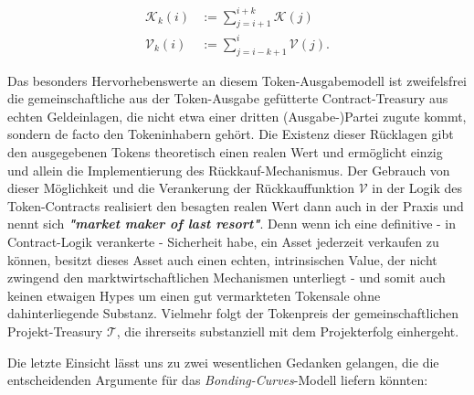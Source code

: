 \begin{align*}
\mathcal{K}_{k} \left( i \right) &:= \sum_{j = i + 1}^{i + k} \mathcal{K} \left( j \right) \\
\mathcal{V}_{k} \left( i \right) &:= \sum_{j = i - k + 1}^{i} \mathcal{V} \left( j \right).
\end{align*}

\vspace{0.3cm}

Das besonders Hervorhebenswerte an diesem Token-Ausgabemodell ist zweifelsfrei die gemeinschaftliche aus der Token-Ausgabe gefütterte Contract-Treasury aus echten Geldeinlagen, die nicht etwa einer dritten (Ausgabe-)Partei zugute kommt, sondern de facto den Tokeninhabern gehört. Die Existenz dieser Rücklagen gibt den ausgegebenen Tokens theoretisch einen realen Wert und ermöglicht einzig und allein die Implementierung des Rückkauf-Mechanismus. Der Gebrauch von dieser Möglichkeit und die Verankerung der Rückkauffunktion $\mathbf{\mathcal{V}}$ in der Logik des Token-Contracts realisiert den besagten realen Wert dann auch in der Praxis und nennt sich \textbf{\textit{"market maker of last resort"}}. Denn wenn ich eine definitive - in Contract-Logik verankerte - Sicherheit habe, ein Asset jederzeit verkaufen zu können, besitzt dieses Asset auch einen echten, intrinsischen Value, der nicht zwingend den marktwirtschaftlichen Mechanismen unterliegt - und somit auch keinen etwaigen Hypes um einen gut vermarkteten Tokensale ohne dahinterliegende Substanz. Vielmehr folgt der Tokenpreis der gemeinschaftlichen Projekt-Treasury $\mathbf{\mathcal{T}}$, die ihrerseits substanziell mit dem Projekterfolg einhergeht. 

\vspace{0.2cm}

Die letzte Einsicht lässt uns zu zwei wesentlichen Gedanken gelangen, die die entscheidenden Argumente für das \textit{Bonding-Curves}-Modell liefern könnten:

